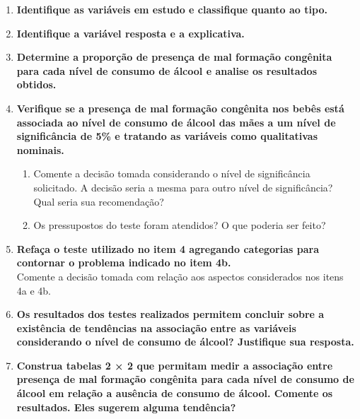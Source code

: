 \documentclass[
]{article}
\providecommand{\tightlist}{%
  \setlength{\itemsep}{0pt}\setlength{\parskip}{0pt}}
\begin{document}
\begin{enumerate}
\def\labelenumi{\arabic{enumi}.}
\item
  \textbf{Identifique as variáveis em estudo e classifique quanto ao
  tipo.}
\item
  \textbf{Identifique a variável resposta e a explicativa.}
\item
  \textbf{Determine a proporção de presença de mal formação congênita
  para cada nível de consumo de álcool e analise os resultados obtidos.}
\item
  \textbf{Verifique se a presença de mal formação congênita nos bebês
  está associada ao nível de consumo de álcool das mães a um nível de
  significância de 5\% e tratando as variáveis como qualitativas
  nominais.}

  \begin{enumerate}
  \def\labelenumii{\alph{enumii})}
  \tightlist
  \item
    Comente a decisão tomada considerando o nível de significância
    solicitado. A decisão seria a mesma para outro nível de
    significância? Qual seria sua recomendação?\\
  \item
    Os pressupostos do teste foram atendidos? O que poderia ser feito?\\
  \end{enumerate}
\item
  \textbf{Refaça o teste utilizado no item 4 agregando categorias para
  contornar o problema indicado no item 4b.}\\
  Comente a decisão tomada com relação aos aspectos considerados nos
  itens 4a e 4b.\\
\item
  \textbf{Os resultados dos testes realizados permitem concluir sobre a
  existência de tendências na associação entre as variáveis considerando
  o nível de consumo de álcool? Justifique sua resposta.}
\item
  \textbf{Construa tabelas 2 × 2 que permitam medir a associação entre
  presença de mal formação congênita para cada nível de consumo de
  álcool em relação a ausência de consumo de álcool. Comente os
  resultados. Eles sugerem alguma tendência?}
\end{enumerate}
\end{document}
